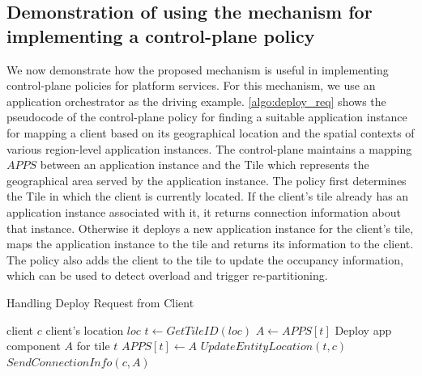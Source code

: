 \subsection{Demonstration of using the mechanism for implementing a control-plane policy}
We now demonstrate how the proposed mechanism is useful in implementing control-plane policies for platform services. For this mechanism, we use an application orchestrator as the driving example. \cref{algo:deploy_req} shows the pseudocode of the control-plane policy for finding a suitable application instance for mapping a client based on its geographical location and the spatial contexts of various region-level application instances. The control-plane maintains a mapping $APPS$ between an application instance and the Tile which represents the geographical area served by the application instance. The policy first determines the Tile in which the client is currently located. If the client's tile already has an application instance associated with it, it returns connection information about that instance. Otherwise it deploys a new application instance for the client's tile, maps the application instance to the tile and returns its information to the client. The policy also adds the client to the tile to update the occupancy information, which can be used to detect overload and trigger re-partitioning.
\begin{algorithm}
\caption{Handling Deploy Request from Client}
\begin{algorithmic}
\Require client $c$
\Require client's location $loc$
\State $t \gets GetTileID \left( loc \right)$
    \State $A \gets APPS \left[ t \right]$
\Else
    \State Deploy app component $A$ for tile $t$
    \State $APPS  \left[ t \right] \gets A$
\EndIf
\State $UpdateEntityLocation \left(t, c \right)$
\State $SendConnectionInfo \left(c, A \right)$ 
\end{algorithmic}
\label{algo:deploy_req}
\end{algorithm}

